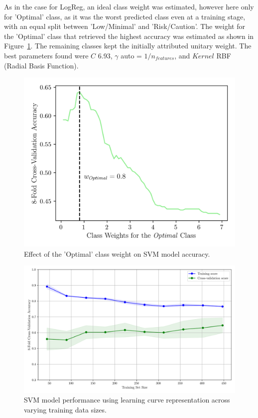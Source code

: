 \documentclass[conference]{IEEEtran}
\begin{document}
As in the case for LogReg, an ideal class weight was estimated, however here only for 'Optimal' class, as it was the worst predicted class even at a training stage, with an equal split between 'Low/Minimal' and 'Risk/Caution'. The weight for the 'Optimal' class that retrieved the highest accuracy was estimated as shown in Figure~\ref{svm_weight}. The remaining classes kept the initially attributed unitary weight.
The best parameters found were $C$ 6.93, $\gamma$ auto = $1/n_{features}$, and $Kernel$ RBF (Radial Basis Function).


\begin{figure}[H]
    \centering
    \includegraphics[width=1\linewidth]{assets/SVM_OptimalWeight.png}
    \caption{Effect of the 'Optimal' class weight on SVM model accuracy.}
    \label{svm_weight}
\end{figure}


\begin{figure}[H]
    \centering
    \includegraphics[width=1\linewidth]{assets/SVM_LearningCurve.png}
    \caption{SVM model performance using learning curve representation across varying training data sizes.}
    \label{svm_learningcurve}
\end{figure}
\end{document}
